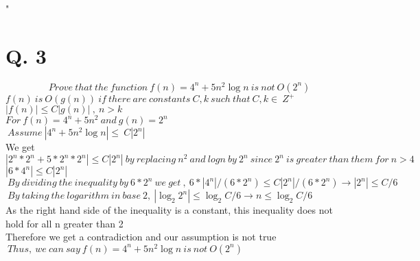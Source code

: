 " \documentclass[10pt]{article}
\begin{document}
\section*{Q. 3}
 \begin{equation*}
  \ Prove \ that \ the \ function \ f(n)=4^n + 5n^2 \log n \ is \ not \ O(2^n)
  \end{equation*}
  $f(n) \ is \ O(g(n)) \ if \ there \ are \ constants \ C,k \ such \ that \ C,k \in \ Z^+$\\
  $|f(n)| \leq C|g(n)| \ , \ n>k$\\
  $For \ f(n)=4^n + 5n^2 \ and \ g(n)=2^n$\\
  $\ Assume \ |4^n + 5n^2 \log n| \leq \ C|2^n| $\\
  We get 
  $|2^n*2^n + 5*2^n*2^n| \leq C|2^n| \ by \ replacing \ n^2 \ and \ logn \ by \ 2^n \ since \ 2^n \ is \ greater \ than \ them \ for \ n>4  $\\
  $|6*4^n| \leq C|2^n| $\\
  $\ By \ dividing \ the \ inequality \ by \ 6*2^n \ we \ get \ , \ 6*|4^n|/(6*2^n) \leq C|2^n|/(6*2^n)\rightarrow |2^n| \leq C/6$\\
  $\ By \ taking \ the \ logarithm \ in \ base \ 2 , \ |\log_2 2^n| \leq \log_2 C/6 \rightarrow n \leq \log_2 C/6$\\
 As the right hand side of the inequality is a constant, this inequality does not hold for all n greater than 2\\
 Therefore we get a contradiction and our assumption is not true\\
 $\ Thus, \ we \ can \ say  \ f(n)=4^n + 5n^2 \log n \ is \ not \ O(2^n)$
  


  
\end{document}
